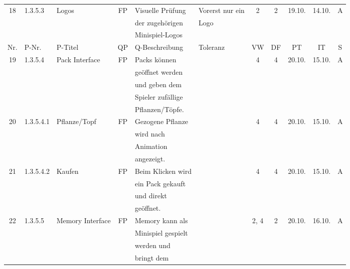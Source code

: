 \begin{longtable}{|c|l|l|c|l|l|c|c|c|c|c|}
            18 & 1.3.5.3 & Logos & FP & Visuelle Prüfung & Vorerst nur ein & 2 & 2 & 19.10. & 14.10. & A \\
            &       &            &    & der zugehörigen &  Logo &   & & & &\\
            &       &            &    & Minispiel-Logos &   &   & & & &\\[10ex]
            \hline
            \hline
            Nr. & P-Nr. & P-Titel & QP & Q-Beschreibung & Toleranz & VW & DF & PT & IT & S \\[0.5ex]
            \hline\hline
            \hline
            19 & 1.3.5.4 & Pack Interface & FP & Packs können &  & 4 & 4 & 20.10. & 15.10. & A \\
            &       &            &    & geöffnet werden &   &   & & & &\\
            &       &            &    & und geben dem &   &   & & & &\\
            &       &            &    & Spieler zufällige &   &   & & & &\\
            &       &            &    & Pflanzen/Töpfe. &   &   & & & &\\
            \hline
            20 & 1.3.5.4.1 & Pflanze/Topf & FP & Gezogene Pflanze &  & 4 & 4 & 20.10. & 15.10. & A \\
            &       &            &    & wird nach  &   &   & & & &\\
            &       &            &    & Animation &   &   & & & &\\
            &       &            &    & angezeigt. &   &   & & & &\\
            \hline
            21 & 1.3.5.4.2 & Kaufen & FP & Beim Klicken wird  &  & 4 & 4 & 20.10. & 15.10. & A \\
            &       &            &    & ein Pack gekauft &   &   & & & &\\
            &       &            &    & und direkt &   &   & & & &\\
            &       &            &    & geöffnet. &   &   & & & &\\
            \hline
            22 & 1.3.5.5 & Memory Interface & FP & Memory kann als &  & 2, 4 & 2 & 20.10. & 16.10. & A \\
            &       &            &    & Minispiel gespielt &   &   & & & &\\
            &       &            &    & werden und  &   &   & & & &\\
            &       &            &    & bringt dem  &   &   & & & &\\

\end{longtable}
